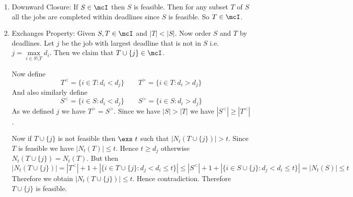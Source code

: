 \begin{alternate-proof}
	\begin{enumerate}[label=\bfseries\tiny\protect\circled{\small\arabic*}]
		\item Downward Closure: If $S\in\mcI$ then $S$ is feasible. Then for any subset $T$ of $S$ all the jobs are completed within deadlines since $S$ is feasible. So $T\in \mcI$.
		\item Exchanges Property: Given $S,T\in\mcI$ and $|T|<|S|$. Now order $S$ and $T$ by deadlines. Let $j$ be the job with largest deadline that is not in $S$ i.e. $j=\underset{i\in S\setminus T}{\max}d_i$. Then we claim that $T\cup \{j\}\in\mcI$. \parinn
		
		Now define $$T^<=\{i\in T\colon d_i<d_j\}\qquad T^>=\{i\in T\colon d_i>d_j\}$$And also similarly define$$S^<=\{i\in S\colon d_i<d_j\}\qquad S^>=\{i\in S\colon d_i>d_j\}$$As we defined $j$ we have $T^>=S^>$. Since we have $|S|>|T|$ we have $|S^<|\geq |T^<|$.  
		
		Now if $T\cup \{j\}$ is not feasible then $\exs\ t$ such that $|N_t(T\cup \{j\})|>t$. Since $T$ is feasible we have $|N_t(T)|\leq t$. Hence $t\geq d_j$ otherwise $N_t(T\cup \{j\})=N_t(T)$. But then $$|N_t(T\cup \{j\})|=|T^<|+1+|\{i\in T\cup \{j\}\colon d_j<d_i\leq t\}|\leq |S^<|+1+|\{i\in S\cup \{j\}\colon d_j<d_i\leq t\}|=|N_t(S)|\leq t$$Therefore we obtain $|N_t(T\cup \{j\})|\leq t$. Hence contradiction. Therefore $T\cup \{j\}$ is feasible.
	\end{enumerate}
\end{alternate-proof}


